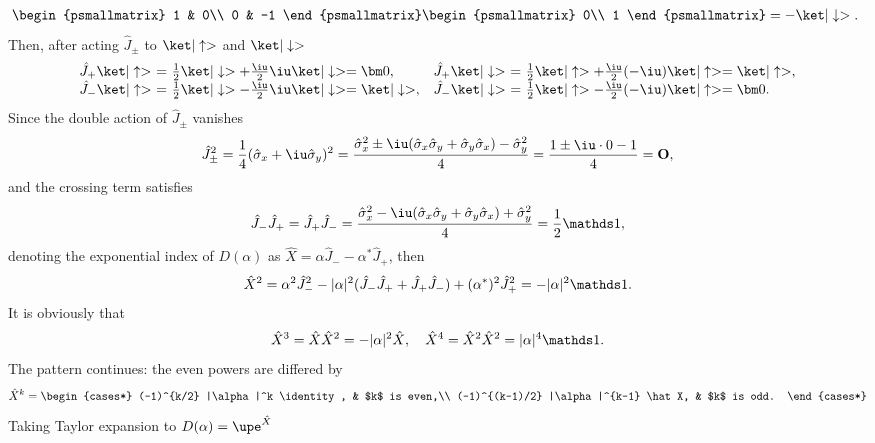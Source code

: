 \begin{solution}
\begin{enumext}
\[\begin{array}{@{}*2{l@{~}c@{~}l@{\quad}}l@{~}c@{~}l@{}}
      \begin{psmallmatrix}
        1 & 0\\ 0 & -1
      \end{psmallmatrix}
      \begin{psmallmatrix}
        0\\ 1
      \end{psmallmatrix} = -\ket|\downarrow>.
    \end{array}\]
    Then, after acting $\hat J_\pm$ to $\ket|\uparrow>$ and $\ket|\downarrow>$
    \[\begin{array}{@{}l@{~}c@{~}l@{\quad}l@{~}c@{~}l@{}}
      \hat J_+ \ket|\uparrow> & = & \frac12\ket|\downarrow>
        + \frac\iu2 \iu\ket|\downarrow> = \bm 0, &
      \hat J_+ \ket|\downarrow> & = & \frac12\ket|\uparrow>
        + \frac\iu2 (-\iu)\ket|\uparrow> = \ket|\uparrow>, \\
      \hat J_- \ket|\uparrow> & = & \frac12\ket|\downarrow>
        - \frac\iu2 \iu\ket|\downarrow> = \ket|\downarrow>, &
      \hat J_- \ket|\downarrow> & = & \frac12\ket|\uparrow>
        - \frac\iu2 (-\iu)\ket|\uparrow> = \bm 0.
    \end{array}\]
    Since the double action of $\hat J_\pm$ vanishes
    \[
      \hat J_\pm^2 = \frac14 (\hat \sigma_x + \iu\hat \sigma_y)^2
    = \frac{\hat \sigma_x^2 \pm\iu(\hat \sigma_x\hat \sigma_y
      + \hat \sigma_y\hat \sigma_x) - \hat \sigma_y^2}{4}
    = \frac{1 \pm \iu \cdot 0 - 1}4 = \mathbf O,
    \]
    and the crossing term satisfies
    \[
      \hat J_- \hat J_+ = \hat J_+ \hat J_-
    = \frac{\hat \sigma_x^2 - \iu(\hat \sigma_x\hat \sigma_y
      + \hat \sigma_y\hat \sigma_x) + \hat \sigma_y^2}{4}
    = \frac12 \identity,
    \]
    denoting the exponential index of $D(\alpha)$
    as $\hat X = \alpha \hat J_- - \alpha^* \hat J_+$, then
    \[
      \hat X^2 = \alpha^2\hat J_-^2
        - |\alpha|^2(\hat J_-\hat J_+ + \hat J_+\hat J_-)
        + (\alpha^*)^2 \hat J_+^2
    = -|\alpha|^2 \identity.
    \]
    It is obviously that
    \[
      \hat X^3 = \hat X \hat X^2 = -|\alpha|^2 \hat X, \quad
      \hat X^4 = \hat X^2 \hat X^2 = |\alpha|^4 \identity. 
    \]
    The pattern continues: the even powers are differed by
    \[
      \hat X^k
    = \begin{cases*}
        (-1)^{k/2} |\alpha|^k \identity,      & $k$ is even,\\
        (-1)^{(k-1)/2} |\alpha|^{k-1} \hat X, & $k$ is odd.
      \end{cases*}
    \]
    Taking Taylor expansion to $D(\alpha) = \upe^{\hat X}$

\end{enumext}
\end{solution}
